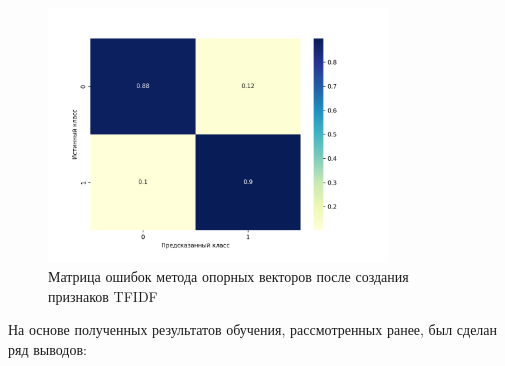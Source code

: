 \documentclass[bachelor, och, coursework]{SCWorks}
\begin{document}
        \begin{figure}[H]
            \centering
            \includegraphics[width=0.8\textwidth]{pic/TFIDF-SVM.png}
            \caption{Матрица ошибок метода опорных векторов после создания признаков TFIDF}
        \end{figure}

\conclusion

    На основе полученных результатов обучения, рассмотренных ранее, был сделан
    ряд выводов:
\end{document}
